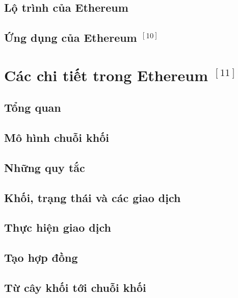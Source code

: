 \documentclass[12pt]{article}
\begin{document}
		\subsection{Lộ trình của Ethereum}
		
		
		\subsection{Ứng dụng của Ethereum $^{[10]}$}
		
	
	\newpage
	\section{Các chi tiết trong Ethereum $^{[11]}$}
		\subsection{Tổng quan}
		
	
		\subsection{Mô hình chuỗi khối}
		
	
		\subsection{Những quy tắc}
		
	
		\subsection{Khối, trạng thái và các giao dịch}
		
		
		\subsection{Thực hiện giao dịch}
		
		
		\subsection{Tạo hợp đồng}
					
		
		\subsection{Từ cây khối tới chuỗi khối}
		
		
\end{document}
